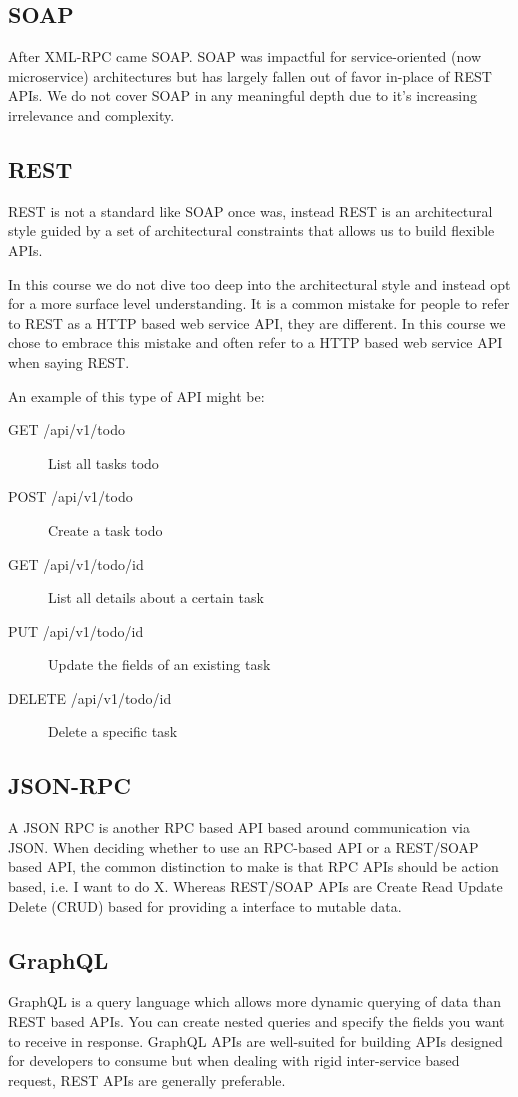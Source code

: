 \documentclass{csse4400}
\begin{document}
\subsection{SOAP}
After XML-RPC came SOAP.
SOAP was impactful for service-oriented (now microservice) architectures but has largely fallen out of favor in-place of REST APIs.
We do not cover SOAP in any meaningful depth due to it's increasing irrelevance and complexity.

\subsection{REST}
REST is not a standard like SOAP once was,
instead REST is an architectural style guided by a set of architectural constraints that allows us to build flexible APIs.

In this course we do not dive too deep into the architectural style and instead opt for a more surface level understanding.
It is a common mistake for people to refer to REST as a HTTP based web service API,
they are different.
In this course we chose to embrace this mistake and often refer to a HTTP based web service API when saying REST.

\noindent An example of this type of API might be:
\begin{description}
  \item[GET /api/v1/todo] List all tasks todo
  \item[POST /api/v1/todo] Create a task todo
  \item[GET /api/v1/todo/{id}] List all details about a certain task
  \item[PUT /api/v1/todo/{id}] Update the fields of an existing task
  \item[DELETE /api/v1/todo/{id}] Delete a specific task
\end{description}

\subsection{JSON-RPC}
A JSON RPC is another RPC based API based around communication via JSON.
When deciding whether to use an RPC-based API or a REST/SOAP based API,
the common distinction to make is that RPC APIs should be action based, i.e. I want to do X.
Whereas REST/SOAP APIs are Create Read Update Delete (CRUD) based for providing a interface to mutable data.

\subsection{GraphQL}
GraphQL is a query language which allows more dynamic querying of data than REST based APIs.
You can create nested queries and specify the fields you want to receive in response.
GraphQL APIs are well-suited for building APIs designed for developers to consume but when dealing with rigid inter-service based request,
REST APIs are generally preferable.
\end{document}
